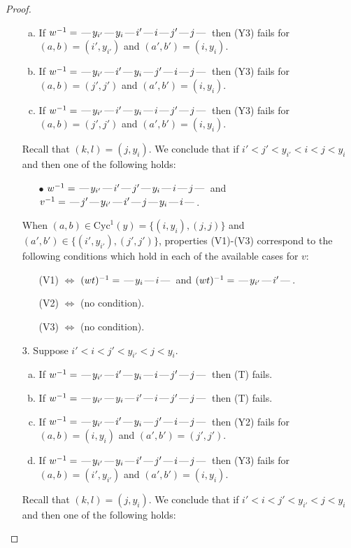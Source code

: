 \documentclass[10pt]{article}
\theoremstyle{definition}
\theoremstyle{definition}
\def\dash{\text{\hspace{0.5mm}---\hspace{0.5mm}}}
\def\Cyc{\mathrm{Cyc}}
\begin{document}
\begin{proof}
\begin{enumerate}
\begin{enumerate}[(a)]
\item If $w^{-1} = \dash y_{i'}\dash y_i\dash i'\dash i\dash j'\dash j\dash $ then (Y3) fails for $(a,b)=(i',y_{i'})$ and $(a',b')=(i,y_i)$.
\item If $w^{-1} = \dash y_{i'}\dash i'\dash y_i\dash j'\dash i\dash j\dash $ then (Y3) fails for $(a,b)=(j',j')$ and $(a',b')=(i,y_i)$.
\item If $w^{-1} = \dash y_{i'}\dash i'\dash y_i\dash i\dash j'\dash j\dash $ then (Y3) fails for $(a,b)=(j',j')$ and $(a',b')=(i,y_i)$.
\end{enumerate}
Recall that $(k,l) = (j,y_i)$.
We conclude that if $i' < j' < y_{i'} < i < j < y_i$ and then one of the following holds:
\begin{enumerate}
\item[$\bullet$] $w^{-1} = \dash y_{i'}\dash i'\dash j'\dash y_i\dash i\dash j\dash $ and $v^{-1} = \dash j'\dash y_{i'}\dash i'\dash j\dash y_i\dash i\dash $.
\end{enumerate}
When $(a,b)\in\Cyc^1(y)=\{(i,y_i),(j,j)\}$ and $(a',b')\in\{(i',y_{i'}),(j',j')\}$,
properties (V1)-(V3) correspond to the following conditions which hold in
each of the available cases for $v$:
\begin{enumerate}
\item[](V1) $\Leftrightarrow$ $(wt)^{-1} = \dash y_i \dash i \dash$  and $(wt)^{-1} = \dash y_{i'} \dash i' \dash$.
\item[](V2) $\Leftrightarrow$ (no condition).
\item[](V3) $\Leftrightarrow$ (no condition).
\end{enumerate}
\item[$3$.] Suppose $i' < i < j' < y_{i'} < j < y_i$.
\begin{enumerate}[(a)]
\item If $w^{-1} = \dash y_{i'}\dash i'\dash y_i\dash i\dash j'\dash j\dash $ then (T) fails.
\item If $w^{-1} = \dash y_{i'}\dash y_i\dash i'\dash i\dash j'\dash j\dash $ then (T) fails.
\item If $w^{-1} = \dash y_{i'}\dash i'\dash y_i\dash j'\dash i\dash j\dash $ then (Y2) fails for $(a,b)=(i,y_i)$ and $(a',b')=(j',j')$.
\item If $w^{-1} = \dash y_{i'}\dash y_i\dash i'\dash j'\dash i\dash j\dash $ then (Y3) fails for $(a,b)=(i',y_{i'})$ and $(a',b')=(i,y_i)$.
\end{enumerate}
Recall that $(k,l) = (j,y_i)$.
We conclude that if $i' < i < j' < y_{i'} < j < y_i$ and then one of the following holds:

\end{enumerate}
\end{proof}
\end{document}
